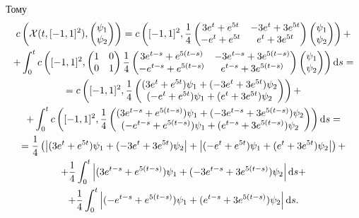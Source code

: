 \begin{solution}
	Тому
	\begin{multline*} 
		c\left(\mathcal{X}(t, [-1,1]^2), \begin{pmatrix} \psi_1 \\ \psi_2 \end{pmatrix}\right) = c\left([-1,1]^2, \frac{1}{4} \begin{pmatrix} 3 e^t + e^{5 t} & -3 e^t + 3 e^{5 t} \\ - e^t + e^{5 t} & e^t + 3 e^{5 t}	\end{pmatrix} \begin{pmatrix} \psi_1 \\ \psi_2 \end{pmatrix} \right) + \\
		+ \int_0^t c\left([-1,1]^2, \begin{pmatrix} 1 & 0 \\ 0 & 1 \end{pmatrix} \frac{1}{4} \begin{pmatrix} 3 e^{t - s} + e^{5 (t - s)} & -3 e^{t - s} + 3 e^{5 (t - s)} \\ - e^{t - s} + e^{5 (t - s)} & e^{t - s} + 3 e^{5 (t - s)} \end{pmatrix} \begin{pmatrix} \psi_1 \\ \psi_2 \end{pmatrix} \right) \mathop{}\!\mathrm{d} s = \\
		= c\left([-1,1]^2, \frac{1}{4} \begin{pmatrix} (3 e^t + e^{5 t}) \psi_1 + (-3 e^t + 3 e^{5 t}) \psi_2 \\ (- e^t + e^{5 t}) \psi_1 + (e^t + 3 e^{5 t}) \psi_2 \end{pmatrix}  \right) + \\
		+ \int_0^t c\left([-1,1]^2, \frac{1}{4} \begin{pmatrix} (3 e^{t - s} + e^{5 (t - s)}) \psi_1 + (-3 e^{t - s} + 3 e^{5 (t - s)}) \psi_2 \\ (- e^{t - s} + e^{5 (t - s)}) \psi_1 + (e^{t - s} + 3 e^{5 (t - s)}) \psi_2 \end{pmatrix} \right) \mathop{}\!\mathrm{d} s = \\
		= \frac{1}{4} \left( \left|(3 e^t + e^{5 t}) \psi_1 + (-3 e^t + 3 e^{5 t}) \psi_2\right| + \left|(- e^t + e^{5 t}) \psi_1 + (e^t + 3 e^{5 t}) \psi_2\right| \right) + \\
		+ \frac{1}{4} \int_0^t \left|(3 e^{t - s} + e^{5 (t - s)}) \psi_1 + (-3 e^{t - s} + 3 e^{5 (t - s)}) \psi_2\right| \mathop{}\!\mathrm{d} s + \\
		+ \frac{1}{4} \int_0^t \left|(- e^{t - s} + e^{5 (t - s)}) \psi_1 + (e^{t - s} + 3 e^{5 (t - s)}) \psi_2\right| \mathop{}\!\mathrm{d} s.
	\end{multline*}
\end{solution}